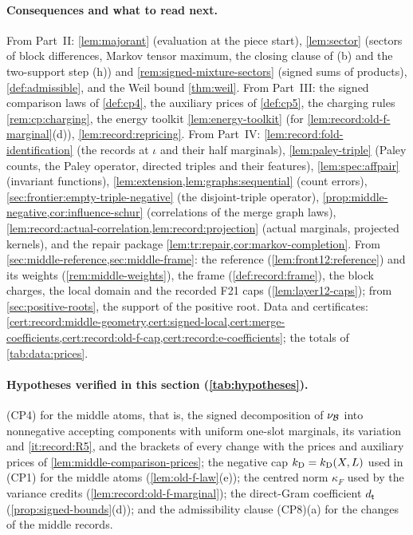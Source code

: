 \paragraph{Consequences and what to read next.}
From Part~II: \cref{lem:majorant} (evaluation at the piece start),
\cref{lem:sector} (sectors of block differences, Markov tensor maximum, the
closing clause of (b) and the two-support step (h)) and
\cref{rem:signed-mixture-sectors} (signed sums of products),
\cref{def:admissible}, and the Weil bound \cref{thm:weil}. From Part~III: the
signed comparison laws of \cref{def:cp4}, the auxiliary prices of
\cref{def:cp5}, the charging rules \cref{rem:cp:charging}, the energy toolkit
\cref{lem:energy-toolkit} (for \cref{lem:record:old-f-marginal}(d)),
\cref{lem:record:repricing}. From Part~IV:
\cref{lem:record:fold-identification} (the records at $\iota$ and their half
marginals),
\cref{lem:paley-triple} (Paley counts, the Paley operator, directed triples and
their features), \cref{lem:spec:affpair} (invariant functions),
\cref{lem:extension,lem:graphs:sequential} (count errors),
\cref{sec:frontier:empty-triple-negative} (the disjoint-triple operator),
\cref{prop:middle-negative,cor:influence-schur} (correlations of the merge graph
laws), \cref{lem:record:actual-correlation,lem:record:projection} (actual marginals,
projected kernels), and the repair package
\cref{lem:tr:repair,cor:markov-completion}.
From \cref{sec:middle-reference,sec:middle-frame}: the reference
(\cref{lem:front12:reference}) and its weights (\cref{rem:middle-weights}), the
frame (\cref{def:record:frame}), the block charges, the local domain and the
recorded F21 caps (\cref{lem:layer12-caps}); from \cref{sec:positive-roots}, the support of the
positive root. Data and certificates:
\cref{cert:record:middle-geometry,cert:signed-local,cert:merge-coefficients,cert:record:old-f-cap,cert:record:e-coefficients};
the totals of \cref{tab:data:prices}.

\paragraph{Hypotheses verified in this section (\cref{tab:hypotheses}).} (CP4) for the middle atoms, that is,
the signed decomposition of $\nu_\mathcal B$ into nonnegative accepting components with
uniform one-slot marginals, its variation and \ref{it:record:R5}, and the
brackets of every change with the prices and auxiliary prices of
\cref{lem:middle-comparison-prices}; the negative cap $k_{\rm D}=k_{\rm D}(X,L)$ used
in (CP1) for the middle atoms (\cref{lem:old-f-law}(e)); the centred norm
$\kappa_F$ used by the variance credits (\cref{lem:record:old-f-marginal}); the
direct-Gram coefficient $d_\mathsf t$ (\cref{prop:signed-bounds}(d)); and the
admissibility clause (CP8)(a) for the changes of the middle records.
